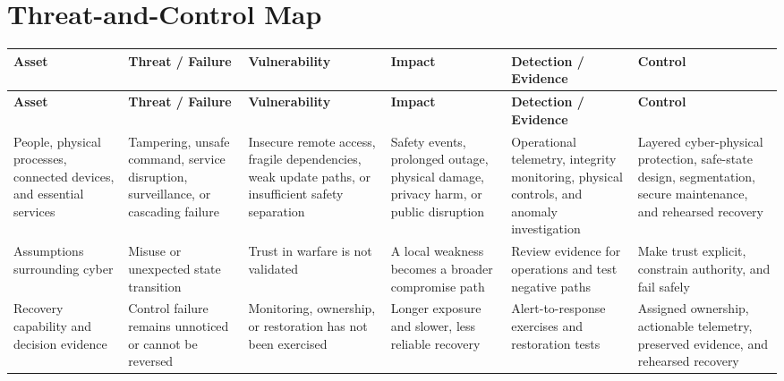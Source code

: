 \documentclass[11pt]{article}
\begin{document}
\section*{Threat-and-Control Map}
\begingroup\scriptsize\setlength{\tabcolsep}{2pt}
\begin{longtable}{>{\RaggedRight\arraybackslash}p{}>{\RaggedRight\arraybackslash}p{}>{\RaggedRight\arraybackslash}p{}>{\RaggedRight\arraybackslash}p{}>{\RaggedRight\arraybackslash}p{}>{\RaggedRight\arraybackslash}p{}}
\toprule\rowcolor{Navy}\color{white}\textbf{Asset} & \color{white}\textbf{Threat / Failure} & \color{white}\textbf{Vulnerability} & \color{white}\textbf{Impact} & \color{white}\textbf{Detection / Evidence} & \color{white}\textbf{Control}\\\midrule
\endfirsthead
\toprule\rowcolor{Navy}\color{white}\textbf{Asset} & \color{white}\textbf{Threat / Failure} & \color{white}\textbf{Vulnerability} & \color{white}\textbf{Impact} & \color{white}\textbf{Detection / Evidence} & \color{white}\textbf{Control}\\\midrule
\endhead
People, physical processes, connected devices, and essential services & Tampering, unsafe command, service disruption, surveillance, or cascading failure & Insecure remote access, fragile dependencies, weak update paths, or insufficient safety separation & Safety events, prolonged outage, physical damage, privacy harm, or public disruption & Operational telemetry, integrity monitoring, physical controls, and anomaly investigation & Layered cyber-physical protection, safe-state design, segmentation, secure maintenance, and rehearsed recovery\\\midrule
Assumptions surrounding cyber & Misuse or unexpected state transition & Trust in warfare is not validated & A local weakness becomes a broader compromise path & Review evidence for operations and test negative paths & Make trust explicit, constrain authority, and fail safely\\\midrule
Recovery capability and decision evidence & Control failure remains unnoticed or cannot be reversed & Monitoring, ownership, or restoration has not been exercised & Longer exposure and slower, less reliable recovery & Alert-to-response exercises and restoration tests & Assigned ownership, actionable telemetry, preserved evidence, and rehearsed recovery\\\midrule
\bottomrule
\end{longtable}
\endgroup
\end{document}
